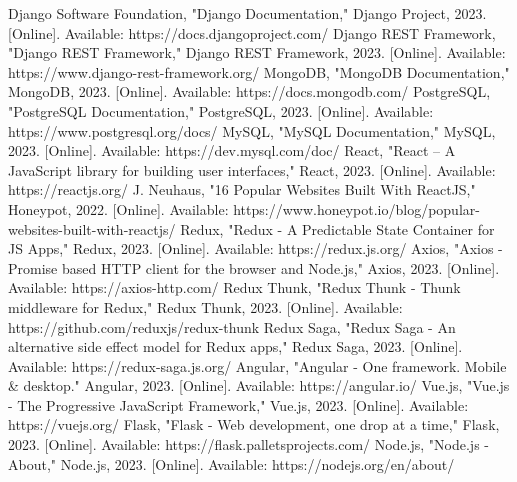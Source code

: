 \documentclass[conference]{IEEEtran}
\begin{document}
\begin{thebibliography}{00}
 Django Software Foundation, "Django Documentation," Django Project, 2023. [Online]. Available: https://docs.djangoproject.com/
 Django REST Framework, "Django REST Framework," Django REST Framework, 2023. [Online]. Available: https://www.django-rest-framework.org/
 MongoDB, "MongoDB Documentation," MongoDB, 2023. [Online]. Available: https://docs.mongodb.com/
 PostgreSQL, "PostgreSQL Documentation," PostgreSQL, 2023. [Online]. Available: https://www.postgresql.org/docs/
 MySQL, "MySQL Documentation," MySQL, 2023. [Online]. Available: https://dev.mysql.com/doc/
 React, "React – A JavaScript library for building user interfaces," React, 2023. [Online]. Available: https://reactjs.org/
 J. Neuhaus, "16 Popular Websites Built With ReactJS," Honeypot, 2022. [Online]. Available: https://www.honeypot.io/blog/popular-websites-built-with-reactjs/
 Redux, "Redux - A Predictable State Container for JS Apps," Redux, 2023. [Online]. Available: https://redux.js.org/
 Axios, "Axios - Promise based HTTP client for the browser and Node.js," Axios, 2023. [Online]. Available: https://axios-http.com/
 Redux Thunk, "Redux Thunk - Thunk middleware for Redux," Redux Thunk, 2023. [Online]. Available: https://github.com/reduxjs/redux-thunk
 Redux Saga, "Redux Saga - An alternative side effect model for Redux apps," Redux Saga, 2023. [Online]. Available: https://redux-saga.js.org/
 Angular, "Angular - One framework. Mobile \& desktop." Angular, 2023. [Online]. Available: https://angular.io/
 Vue.js, "Vue.js - The Progressive JavaScript Framework," Vue.js, 2023. [Online]. Available: https://vuejs.org/
 Flask, "Flask - Web development, one drop at a time," Flask, 2023. [Online]. Available: https://flask.palletsprojects.com/
 Node.js, "Node.js - About," Node.js, 2023. [Online]. Available: https://nodejs.org/en/about/
\end{thebibliography}
\vspace{12pt}
\end{document}
